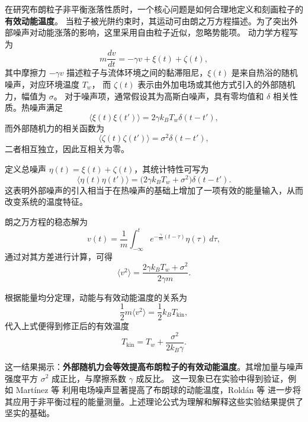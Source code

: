 \documentclass[a4paper]{report} %
\begin{document}
在研究布朗粒子非平衡涨落性质时，一个核心问题是如何合理地定义和刻画粒子的\textbf{有效动能温度}。
当粒子被光阱约束时，其运动可由朗之万方程描述。为了突出外部噪声对动能涨落的影响，这里采用自由粒子近似，忽略势能项。
动力学方程写为
\begin{equation}
m \frac{dv}{dt} = -\gamma v + \xi(t) + \zeta(t),
\end{equation}
其中摩擦力 $-\gamma v$ 描述粒子与流体环境之间的黏滞阻尼，$\xi(t)$ 是来自热浴的随机噪声，对应环境温度 $T_w$，
而 $\zeta(t)$ 表示由外加电场或其他方式引入的外部随机力，幅值为 $\sigma$。  
对于噪声项，通常假设其为高斯白噪声，具有零均值和 $\delta$ 相关性质。热噪声满足
\begin{equation}
\langle \xi(t) \xi(t') \rangle = 2\gamma k_B T_w \delta(t - t'),
\end{equation}
而外部随机力的相关函数为
\begin{equation}
\langle \zeta(t) \zeta(t') \rangle = \sigma^2 \delta(t - t'),
\end{equation}
二者相互独立，因此互相关为零。 \par 

定义总噪声 $\eta(t) = \xi(t) + \zeta(t)$，其统计特性可写为
\begin{equation}
\langle \eta(t)\eta(t') \rangle = \big( 2\gamma k_B T_w + \sigma^2 \big)\delta(t - t').
\end{equation}
这表明外部噪声的引入相当于在热噪声的基础上增加了一项有效的能量输入，从而改变系统的温度特征。  

朗之万方程的稳态解为
\begin{equation}
v(t) = \frac{1}{m} \int_{-\infty}^{t} e^{-\frac{\gamma}{m}(t-\tau)} \eta(\tau) \, d\tau,
\end{equation}
通过对其方差进行计算，可得
\begin{equation}
\langle v^2 \rangle = \frac{2\gamma k_B T_w + \sigma^2}{2\gamma m}.
\end{equation}

根据能量均分定理，动能与有效动能温度的关系为
\begin{equation}
\frac{1}{2} m \langle v^2 \rangle = \frac{1}{2} k_B T_{\text{kin}},
\end{equation}
代入上式便得到修正后的有效温度
\begin{equation}
T_{\text{kin}} = T_w + \frac{\sigma^2}{2k_B \gamma}.
\label{eq:Teff}
\end{equation}\par
这一结果揭示：\textbf{外部随机力会等效提高布朗粒子的有效动能温度}。其增加量与噪声强度平方 $\sigma^2$ 成正比，与摩擦系数 $\gamma$ 成反比。
这一现象已在实验中得到验证，例如 Martínez 等 \cite{Martinez2013} 利用电场噪声显著提高了布朗球的动能温度，Roldán 等 \cite{Roldan2014}
进一步将其应用于非平衡过程的能量测量。上述理论公式为理解和解释这些实验结果提供了坚实的基础。
\end{document}
